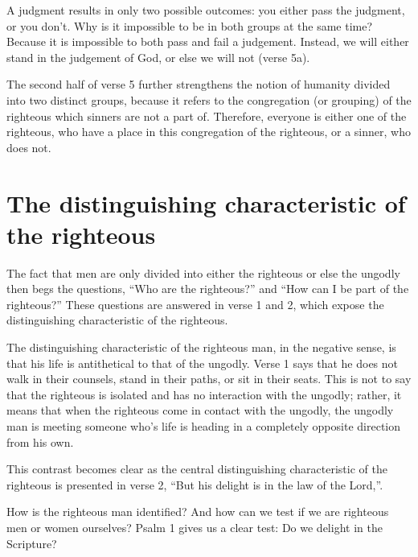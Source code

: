 A judgment results in only two possible outcomes:
    you either pass the judgment, or you don't.
Why is it impossible to be in both groups at the same time?
Because it is impossible to both pass and fail a judgement.
Instead, we will either stand in the judgement of God,
    or else we will not (verse 5a).

The second half of verse 5 further strengthens the notion
    of humanity divided into two distinct groups,
    because it refers to the congregation (or grouping) of the righteous
    which sinners are not a part of.
Therefore, everyone is either one of the righteous,
    who have a place in this congregation of the righteous,
    or a sinner, who does not.
    
\section{The distinguishing characteristic of the righteous}
The fact that men are only divided into either 
    the righteous or else the ungodly 
    then begs the questions,
    ``Who are the righteous?'' and
    ``How can I be part of the righteous?''
These questions are answered in verse 1 and 2,
    which expose the distinguishing characteristic of the righteous.
    
The distinguishing characteristic of the righteous man,
    in the negative sense,
    is that his life is antithetical to that of the ungodly.
Verse 1 says that he does not walk in their counsels, 
    stand in their paths, or sit in their seats.
This is not to say that the righteous is isolated and
    has no interaction with the ungodly;
    rather, it means that when the righteous
    come in contact with the ungodly,
    the ungodly man is meeting someone who's life is heading
    in a completely opposite direction from his own.

This contrast becomes clear as the central distinguishing characteristic
    of the righteous is presented in verse 2,
    ``But his delight is in the law of the Lord,''.

How is the righteous man identified? 
And how can we test if we are righteous men or women ourselves?
Psalm 1 gives us a clear test:
    Do we delight in the Scripture?


